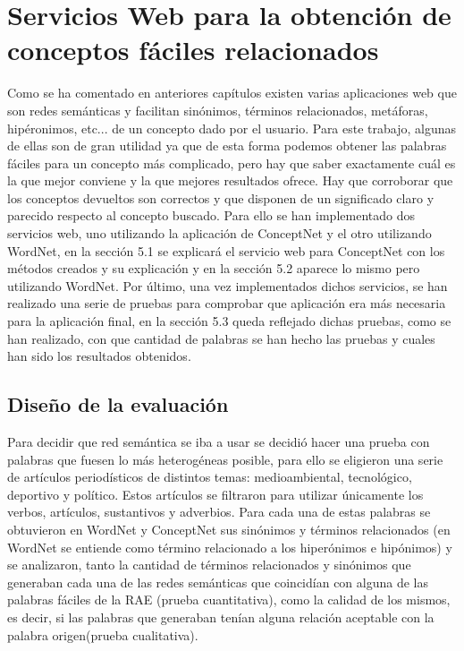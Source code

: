 \chapter{Servicios Web para la obtención de conceptos fáciles relacionados}
\label{cap:serviciosWebImplementados}

Como se ha comentado en anteriores capítulos existen varias aplicaciones web que son redes semánticas y facilitan sinónimos, términos relacionados, metáforas, hipéronimos, etc... de un concepto dado por el usuario. Para este trabajo, algunas de ellas son de gran utilidad ya que de esta forma podemos obtener las palabras fáciles para un concepto más complicado, pero hay que saber exactamente cuál es la que mejor conviene y la que mejores resultados ofrece. Hay que corroborar que los conceptos devueltos son correctos y que disponen de un significado claro y parecido respecto al concepto buscado. Para ello se han implementado dos servicios web, uno utilizando la aplicación de ConceptNet y el otro utilizando WordNet, en la sección 5.1 se explicará el servicio web para ConceptNet con los métodos creados y su explicación y en la sección 5.2 aparece lo mismo pero utilizando WordNet. Por último, una vez implementados dichos servicios, se han realizado una serie de pruebas para comprobar que aplicación era más necesaria para la aplicación final, en la sección 5.3 queda reflejado dichas pruebas, como se han realizado, con que cantidad de palabras se han hecho las pruebas y cuales han sido los resultados obtenidos.


\section{Diseño de la evaluación}
\label{cap:sec:disenoEval}

Para decidir que red semántica se iba a usar se decidió hacer una prueba con palabras que fuesen lo más heterogéneas posible, para ello se eligieron una serie de artículos periodísticos de distintos temas: medioambiental, tecnológico, deportivo y político. Estos artículos se filtraron para utilizar únicamente los verbos, artículos, sustantivos y adverbios. Para cada una de estas palabras se obtuvieron en WordNet y ConceptNet sus sinónimos y términos relacionados (en WordNet se entiende como término relacionado a los hiperónimos e hipónimos) y se analizaron, tanto la cantidad de términos relacionados y sinónimos que generaban cada una de las redes semánticas que coincidían con alguna de las palabras fáciles de la RAE (prueba cuantitativa), como la calidad de los mismos, es decir, si las palabras que generaban tenían alguna relación aceptable con la palabra origen(prueba cualitativa).

